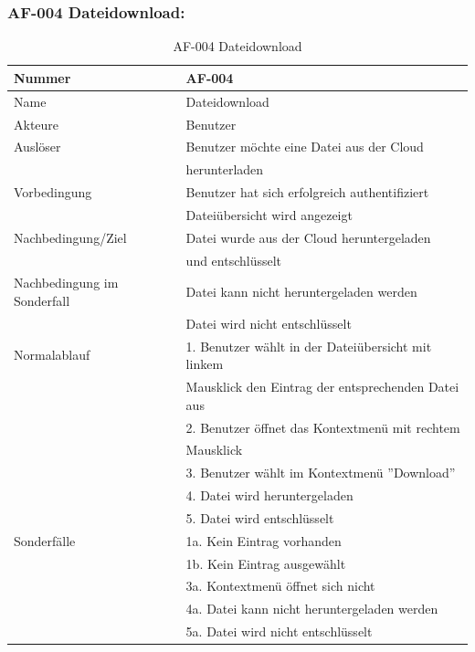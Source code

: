 \documentclass[13pt,a4paper,bibliography=totocnumbered,listof=totocnumbered]{scrartcl}
\begin{document}
\subsubsection{AF-004 Dateidownload:}
\begin{table}[!h]
	\centering
	\begin{tabular}{|l|l|}
		\hline
		Nummer & AF-004\\
		\hline
		Name & Dateidownload\\
		\hline
		Akteure & Benutzer\\
		\hline
		Auslöser & Benutzer möchte eine Datei aus der Cloud \\ & herunterladen\\
		\hline
		Vorbedingung & Benutzer hat sich erfolgreich authentifiziert \\ & Dateiübersicht wird angezeigt\\
		\hline
		Nachbedingung/Ziel & Datei wurde aus der Cloud heruntergeladen \\ & und entschlüsselt \\
		\hline
		Nachbedingung im Sonderfall & Datei kann nicht heruntergeladen werden \\ & Datei wird nicht entschlüsselt\\
		\hline
		Normalablauf & 1. Benutzer wählt in der Dateiübersicht mit linkem \\&Mausklick den Eintrag der entsprechenden Datei aus \\ & 2. Benutzer öffnet das Kontextmenü mit rechtem\\& Mausklick \\ & 3. Benutzer wählt im Kontextmenü ''Download'' \\  & 4. Datei wird heruntergeladen \\ & 5. Datei wird entschlüsselt \\
		\hline
		Sonderfälle & 1a. Kein Eintrag vorhanden\\& 1b. Kein Eintrag ausgewählt\\ & 3a. Kontextmenü öffnet sich nicht \\& 4a. Datei kann nicht heruntergeladen werden \\ & 5a. Datei wird nicht entschlüsselt\\
		\hline
	\end{tabular}
	\caption{AF-004 Dateidownload}
	\label{tab:AF-004 Dateidownload}
\end{table}
\pagebreak
\end{document}
